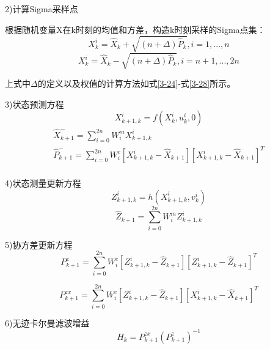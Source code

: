 2)计算Sigma采样点

根据随机变量X在k时刻的均值和方差，构造k时刻采样的Sigma点集：
\begin{equation}
X_{k}^{i}={{\widehat{X}}_{k}}+\sqrt{(n+\Delta ){{\widehat{P}}_{k}}},i=1,...,n
\end{equation}    
\begin{equation}
X_{k}^{i}={{\widehat{X}}_{k}}-\sqrt{(n+\Delta ){{\widehat{P}}_{k}}},i=n+1,...,2n
\end{equation} 

上式中$\Delta $的定义以及权值的计算方法如式\ref{3-24}-式\ref{3-28}所示。

3)状态预测方程
\begin{equation}
X_{k+1,k}^{i}=f\left( X_{k}^{i},u_{k}^{i},0 \right)
\end{equation} 
\begin{equation}
\begin{array}{l}
   \widehat{X}_{k+1}^{-}=\sum\limits_{i=0}^{2n}{W_{i}^{m}X_{k+1,k}^{i}} \\ 
  \widehat{P}_{k+1}^{-}=\sum\limits_{i=0}^{2n}{W_{i}^{c}\left[ X_{k+1,k}^{i}-{{\widehat{X}}_{k+1}} \right]}{{\left[ X_{k+1,k}^{i}-{{\widehat{X}}_{k+1}} \right]}^{T}} \\ 
\end{array}
\end{equation} 

4)状态测量更新方程
\begin{equation}
Z_{k+1,k}^{i}=h\left( X_{k+1,k}^{i},v_{k}^{i} \right)
\end{equation} 
\begin{equation}
{\widehat Z_{k + 1}} = \sum\limits_{i = 0}^{2n} {W_i^mZ_{k + 1,k}^i}
\end{equation} 

5)协方差更新方程
\begin{equation}
P_{k + 1}^z = \sum\limits_{i = 0}^{2n} {W_i^c\left[ {Z_{k + 1,k}^i - {{\widehat Z}_{k + 1}}} \right]} {\left[ {Z_{k + 1,k}^i - {{\widehat Z}_{k + 1}}} \right]^T}
\end{equation} 

\begin{equation}
P_{k + 1}^{zx} = \sum\limits_{i = 0}^{2n} {W_i^c\left[ {Z_{k + 1,k}^i - {{\widehat Z}_{k + 1}}} \right]} {\left[ {X_{k + 1,k}^i - {{\widehat X}_{k + 1}}} \right]^T}
\end{equation} 

6)无迹卡尔曼滤波增益
\begin{equation}
{H_k} = P_{k + 1}^{zx}{\left( {P_{k + 1}^z} \right)^{ - 1}}
\end{equation} 

